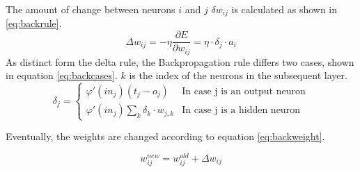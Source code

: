 \documentclass[10pt,a4paper,DIV=11]{scrreprt}
\begin{document}
The amount of change between neurons $i$ and $j$ $\delta w_{ij}$ is calculated as shown in \eqref{eq:backrule}.
\begin{equation}
\Delta w_{ij} = -\eta \frac{\partial E}{\partial w_{ij}} = \eta \cdot \delta_j \cdot a_i
\label{eq:backrule}
\end{equation}
As distinct form the delta rule, the Backpropagation rule differs two cases, shown in equation \eqref{eq:backcases}. $k$ is the index of the neurons in the subsequent layer.
\begin{equation}
   \delta_j =
   \begin{cases}
     \varphi'(in_j)(t_j-o_j) & \text{In case j is an output neuron} \\
     \varphi'(in_j)\sum_{k} \delta_k \cdot w_{j,k} & \text{In case j is a hidden neuron}
   \end{cases}
\label{eq:backcases}
\end{equation}

Eventually, the weights are changed according to equation \eqref{eq:backweight}.

\begin{equation}
   w_{ij}^{new} = w_{ij}^{old} + \Delta w_{ij}
\label{eq:backweight}
\end{equation}
\end{document}
